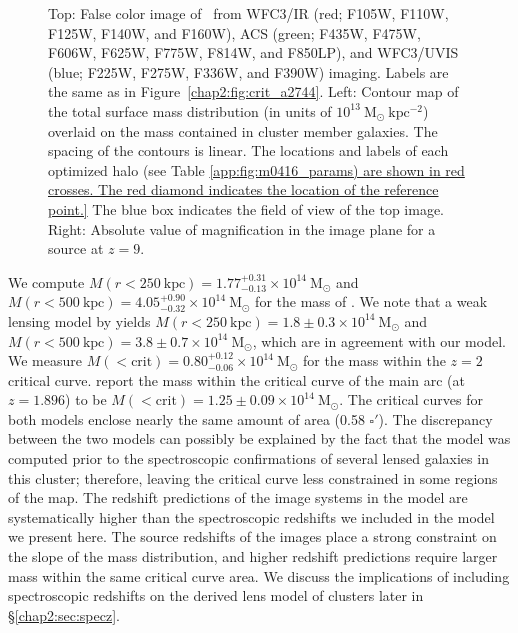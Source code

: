\begin{figure}[h]
\caption[\MACSzerofour\ image constraints and critical curves]{Top: False color image of \MACSzerofour\ from WFC3/IR (red; F105W, F110W, F125W, F140W, and F160W), ACS (green; F435W, F475W, F606W, F625W, F775W, F814W, and F850LP), and WFC3/UVIS (blue; F225W, F275W, F336W, and F390W) imaging. Labels are the same as in Figure~\ref{chap2:fig:crit_a2744}. Left: Contour map of the total surface mass distribution (in units of $10^{13}\ \mathrm{M_\odot \ kpc^{-2}}$) overlaid on the mass contained in cluster member galaxies. The spacing of the contours is linear. The locations and labels of each optimized halo (see Table \ref{app:fig:m0416_params) are shown in red crosses. The red diamond indicates the location of the reference point.} The blue box indicates the field of view of the top image. Right: Absolute value of magnification in the image plane for a source at $z=9$.}
\label{chap2:fig:crit_m0416}
\end{figure}

We compute $M(r<250\ \mathrm{kpc})=1.77^{+0.31}_{-0.13}\times10^{14}\ \mathrm{M_\odot}$ and $M(r<500\ \mathrm{kpc})=4.05^{+0.90}_{-0.32}\times10^{14}\ \mathrm{M_\odot}$ for the mass of \MACSzerofour. We note that a weak lensing model by \citet{Gruen:2014lr} yields $M(r<250\ \mathrm{kpc})=1.8\pm0.3\times10^{14}\ \mathrm{M_\odot}$ and $M(r<500\ \mathrm{kpc})=3.8\pm0.7\times10^{14}\ \mathrm{M_\odot}$, which are in agreement with our model. We measure $M(<\mathrm{crit})=0.80^{+0.12}_{-0.06}\times10^{14}\ \mathrm{M_\odot}$ for the mass within the $z=2$ critical curve. \citet{Zitrin:2013lr} report the mass within the critical curve of the main arc (at $z=1.896$) to be $M(<\mathrm{crit})=1.25\pm0.09\times10^{14}\ \mathrm{M_\odot}$. The critical curves for both models enclose nearly the same amount of area (0.58 $\square'$). The discrepancy between the two models can possibly be explained by the fact that the \citet{Zitrin:2013lr} model was computed prior to the spectroscopic confirmations of several lensed galaxies in this cluster; therefore, leaving the critical curve less constrained in some regions of the map. The redshift predictions of the image systems in the \citet{Zitrin:2013lr} model are systematically higher than the spectroscopic redshifts we included in the model we present here. The source redshifts of the images place a strong constraint on the slope of the mass distribution, and higher redshift predictions require larger mass within the same critical curve area. We discuss the implications of including spectroscopic redshifts on the derived lens model of clusters later in \S \ref{chap2:sec:specz}.

